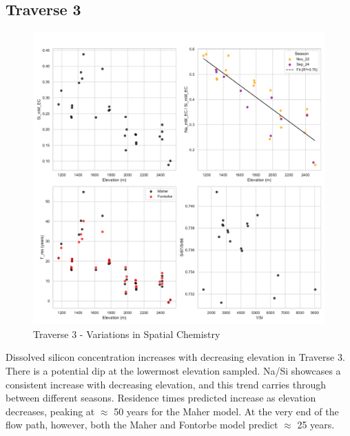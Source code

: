 \newpage

\subsection{Traverse 3}

\begin{figure}[h]
    \centering
        \includegraphics[width=\textwidth]{Traverse_3_summary.pdf}
    \caption{Traverse 3 - Variations in Spatial Chemistry}
    \label{fig:spatial_changes_spring3}
\end{figure}

\FloatBarrier

Dissolved silicon concentration increases with decreasing elevation in Traverse 3. There is a potential dip at the lowermost elevation sampled. Na/Si showcases a consistent increase with decreasing elevation, and this trend carries through between different seasons. Residence times predicted increase as elevation decreases, peaking at $\approx$ 50 years for the Maher model. At the very end of the flow path, however, both the Maher and Fontorbe model predict $\approx$ 25 years. 



\newpage

